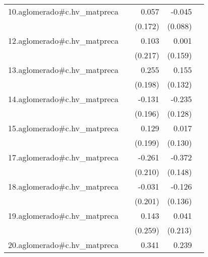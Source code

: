 {\begin{longtable}{l*{4}{D{.}{.}{-1}}}
\addlinespace
10.aglomerado#c.hv\_matpreca&                     &       0.057         &      -0.045         &                     \\
            &                     &     (0.172)         &     (0.088)         &                     \\
\addlinespace
12.aglomerado#c.hv\_matpreca&                     &       0.103         &       0.001         &                     \\
            &                     &     (0.217)         &     (0.159)         &                     \\
\addlinespace
13.aglomerado#c.hv\_matpreca&                     &       0.255         &       0.155         &                     \\
            &                     &     (0.198)         &     (0.132)         &                     \\
\addlinespace
14.aglomerado#c.hv\_matpreca&                     &      -0.131         &      -0.235         &                     \\
            &                     &     (0.196)         &     (0.128)         &                     \\
\addlinespace
15.aglomerado#c.hv\_matpreca&                     &       0.129         &       0.017         &                     \\
            &                     &     (0.199)         &     (0.130)         &                     \\
\addlinespace
17.aglomerado#c.hv\_matpreca&                     &      -0.261         &      -0.372\sym{*}  &                     \\
            &                     &     (0.210)         &     (0.148)         &                     \\
\addlinespace
18.aglomerado#c.hv\_matpreca&                     &      -0.031         &      -0.126         &                     \\
            &                     &     (0.201)         &     (0.136)         &                     \\
\addlinespace
19.aglomerado#c.hv\_matpreca&                     &       0.143         &       0.041         &                     \\
            &                     &     (0.259)         &     (0.213)         &                     \\
\addlinespace
20.aglomerado#c.hv\_matpreca&                     &       0.341         &       0.239         &                     \\

\end{longtable}}
